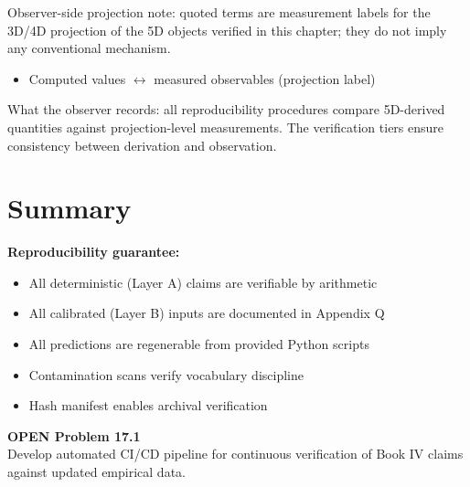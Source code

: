\begin{observerbox}
Observer-side projection note: quoted terms are measurement labels for the
3D/4D projection of the 5D objects verified in this chapter; they do not
imply any conventional mechanism.

\begin{itemize}
    \item Computed values $\leftrightarrow$ measured observables (projection label)
\end{itemize}

What the observer records: all reproducibility procedures compare 5D-derived
quantities against projection-level measurements. The verification tiers
ensure consistency between derivation and observation.
\end{observerbox}

\section{Summary}
\label{sec:repro:summary}

\begin{resultbox}
\textbf{Reproducibility guarantee:}
\begin{itemize}
    \item All deterministic (Layer A) claims are verifiable by arithmetic
    \item All calibrated (Layer B) inputs are documented in Appendix Q
    \item All predictions are regenerable from provided Python scripts
    \item Contamination scans verify vocabulary discipline
    \item Hash manifest enables archival verification
\end{itemize}
\end{resultbox}

\vspace{1em}

\begin{edcopenbox}
\textbf{OPEN Problem 17.1} \tagOPEN \\
Develop automated CI/CD pipeline for continuous verification of Book IV
claims against updated empirical data.
\end{edcopenbox}

